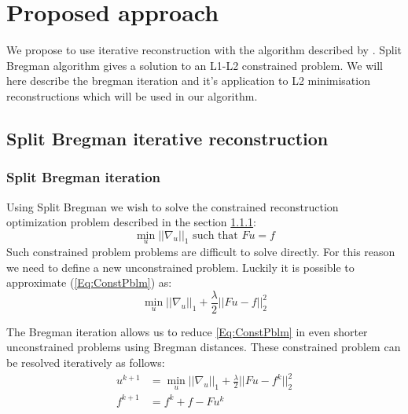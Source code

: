 \chapter{Proposed approach}
We propose to use iterative reconstruction with the algorithm described by \cite{goldstein2009split}. Split Bregman algorithm gives a solution to an L1-L2 constrained problem. We will here describe the bregman iteration and it's application to L2 minimisation reconstructions which will be used in our algorithm.

\section{Split Bregman iterative reconstruction}
    \subsection{Split Bregman iteration}
    Using Split Bregman we wish to solve the constrained reconstruction optimization problem described in the section \ref{}:
    \begin{equation}
        \min\limits_{u}||\nabla_u||_1 \mbox{ such that } Fu=f
        \label{Eq:ConstPblm}
    \end{equation}
 Such constrained problem problems are difficult to solve directly. For this reason we need to define a new unconstrained problem. Luckily it is possible to approximate (\ref{Eq:ConstPblm}) as:
    \begin{equation}
        \min_{u}||\nabla_u||_1 + \frac{\lambda}{2}||Fu-f||_2^2
    \end{equation}
    
    The Bregman iteration allows us to reduce \ref{Eq:ConstPblm} in even shorter unconstrained problems using Bregman distances. These constrained problem can be resolved iteratively as follows:
    \begin{equation}
        \begin{aligned}
            u^{k+1} &= \min_{u} ||\nabla_u||_1 + \frac{\lambda}{2}||Fu - f^k||_2^2 \\
           f^{k+1} &= f^k + f - Fu^k
        \end{aligned}
    \end{equation}
